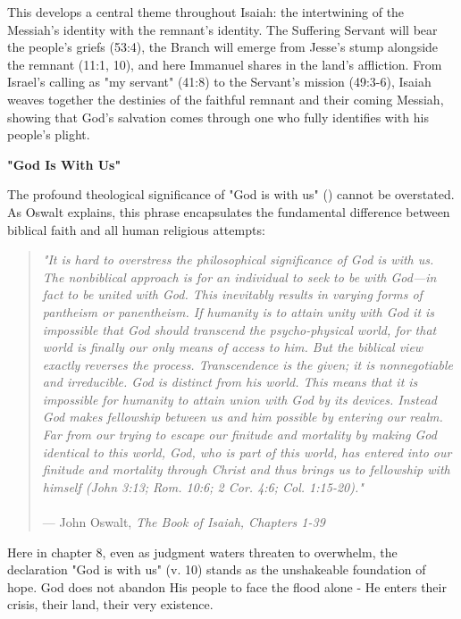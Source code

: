 \documentclass[11pt]{article}
\begin{document}
\vspace{1em}
This develops a central theme throughout Isaiah: the intertwining of the Messiah's identity with the remnant's identity. The Suffering Servant will bear the people's griefs (53:4), the Branch will emerge from Jesse's stump alongside the remnant (11:1, 10), and here Immanuel shares in the land's affliction. From Israel's calling as "my servant" (41:8) to the Servant's mission (49:3-6), Isaiah weaves together the destinies of the faithful remnant and their coming Messiah, showing that God's salvation comes through one who fully identifies with his people's plight.

\vspace{3em}
{\large\bfseries "God Is With Us"}
\vspace{1em}

The profound theological significance of "God is with us" () cannot be overstated. As Oswalt explains, this phrase encapsulates the fundamental difference between biblical faith and all human religious attempts:

\begin{quote}
\textit{"It is hard to overstress the philosophical significance of God is with us. The nonbiblical approach is for an individual to seek to be with God—in fact to be united with God. This inevitably results in varying forms of pantheism or panentheism. If humanity is to attain unity with God it is impossible that God should transcend the psycho-physical world, for that world is finally our only means of access to him. But the biblical view exactly reverses the process. Transcendence is the given; it is nonnegotiable and irreducible. God is distinct from his world. This means that it is impossible for humanity to attain union with God by its devices. Instead God makes fellowship between us and him possible by entering our realm. Far from our trying to escape our finitude and mortality by making God identical to this world, God, who is part of this world, has entered into our finitude and mortality through Christ and thus brings us to fellowship with himself (John 3:13; Rom. 10:6; 2 Cor. 4:6; Col. 1:15-20)."}\\\\
\hfill --- John Oswalt, \textit{The Book of Isaiah, Chapters 1-39}
\end{quote}

\vspace{1em}
Here in chapter 8, even as judgment waters threaten to overwhelm, the declaration "God is with us" (v. 10) stands as the unshakeable foundation of hope. God does not abandon His people to face the flood alone - He enters their crisis, their land, their very existence.
\end{document}
